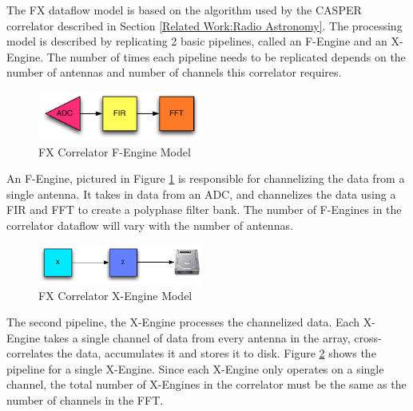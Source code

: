 The FX dataflow model is based on the algorithm used by the CASPER correlator described in Section \ref{Related Work:Radio Astronomy}. The processing model is described by replicating 2 basic pipelines, called an F-Engine and an X-Engine. The number of times each pipeline needs to be replicated depends on the number of antennas and number of channels this correlator requires.

\begin{figure}[h!]
  \centering
    \includegraphics[width=0.48\textwidth]{Images/C4/fx_f_engine.pdf}
  \caption{FX Correlator F-Engine Model}
  \label{fig: C4/fx_f_engine.pdf}
\end{figure}

An F-Engine, pictured in Figure \ref{fig: C4/fx_f_engine.pdf} is responsible for channelizing the data from a single antenna. 
It takes in data from an ADC, and channelizes the data using a FIR and FFT to create a polyphase filter bank. 
The number of F-Engines in the correlator dataflow will vary with the number of antennas.

\begin{figure}[h!]
  \centering
    \includegraphics[width=0.48\textwidth]{Images/C4/fx_x_engine.pdf}
  \caption{FX Correlator X-Engine Model}
  \label{fig: C4/fx_x_engine.pdf}
\end{figure}

The second pipeline, the X-Engine processes the channelized data. 
Each X-Engine takes a single channel of data from every antenna in the array, cross-correlates the data, accumulates it and stores it to disk. 
Figure \ref{fig: C4/fx_x_engine.pdf} shows the pipeline for a single X-Engine. 
Since each X-Engine only operates on a single channel, the total number of X-Engines in the correlator must be the same as the number of channels in the FFT.


